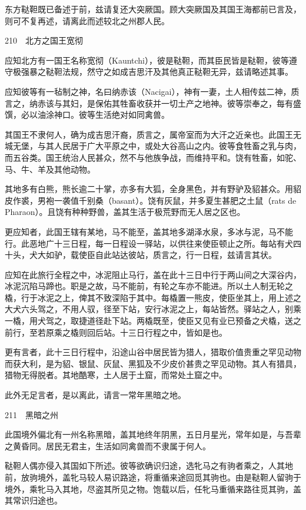 \documentclass[12pt,UTF8]{ctexbook}
\begin{document}
东方鞑靼既已备述于前，兹请复还大突厥国。顾大突厥国及其国王海都前已言及，则可不复再述，请离此而述较北之州郡人民。





210　北方之国王宽彻

应知北方有一国王名称宽彻（Kauntchi），彼是鞑靼，而其臣民皆是鞑靼，彼等遵守极强暴之鞑靼法规，然守之如成吉思汗及其他真正鞑靼无异，兹请略述其事。

应知彼等有一毡制之神，名曰纳赤该（Nacigai），神有一妻，土人相传兹二神，质言之，纳赤该与其妇，是保佑其牲畜收获并一切土产之地神。彼等崇奉之，每有盛馔，必以油涂神口。彼等生活绝对如同禽兽。

其国王不隶何人，确为成吉思汗裔，质言之，属帝室而为大汗之近亲也。此国王无城无堡，与其人民居于广大平原之中，或处大谷高山之内。彼等食牲畜之乳与肉，而五谷类。国王统治人民甚众，然不与他族争战，而维持平和。饶有牲畜，如驼、马、牛、羊及其他动物。

其地多有白熊，熊长逾二十掌，亦多有大狐，全身黑色，并有野驴及貂甚众。用貂皮作裘，男袍一袭值千别桑（basant）。饶有灰鼠，并多夏生甚肥之土鼠（rats de Pharaon）。且饶有种种野兽，盖其生活于极荒野而无人居之区也。

更应知者，此国王辖有某地，马不能至，盖其地多湖泽水泉，多冰与泥，马不能行。此恶地广十三日程，每一日程设一驿站，以供往来使臣顿止之所。每站有犬四十头，犬大如驴，载使臣自此站达彼站，质言之，行一日程，兹请言其状。

应知在此旅行全程之中，冰泥阻止马行，盖在此十三日中行于两山间之大深谷内，冰泥沉陷马蹄也。职是之故，马不能前，有轮之车亦不能进。所以土人制无轮之橇，行于冰泥之上，俾其不致深陷于其中。每橇置一熊皮，使臣坐其上，用上述之大犬六头驾之，不用人驭，径至下站，安行冰泥之上，每站皆然。驿站之人，别乘一橇，用犬驾之，取捷道径赴下站。两橇既至，使臣又见有业已预备之犬橇，送之前行，至若原乘之橇则回后站。十三日行程之中，皆如是也。

更有言者，此十三日行程中，沿途山谷中居民皆为猎人，猎取价值贵重之罕见动物而获大利，是为貂、银鼠、灰鼠、黑狐及不少皮价甚贵之罕见动物。其人有猎具，猎物无得脱者。其地酷寒，土人居于土窟，而常处土窟之中。

此外无足言者，是以离此，请言一常年黑暗之地。





211　黑暗之州

此国境外偏北有一州名称黑暗，盖其地终年阴黑，五日月星光，常年如是，与吾辈之黄昏同。居民无君主，生活如同禽兽而不隶属于何人。

鞑靼人偶亦侵入其国如下所述。彼等欲确识归途，选牝马之有驹者乘之，人其地前，放驹境外，盖牝马较人易识路途，将重循来途回觅其驹也。由是鞑靼人留驹于境外，乘牝马入其地，尽盗其所见之物。饱载以后，任牝马重循来路往觅其驹，盖其常识归途也。
\end{document}
